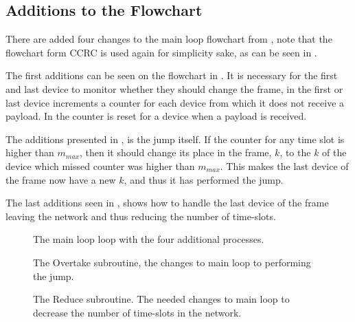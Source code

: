 \subsection{Additions to the Flowchart}
There are added four changes to the main loop flowchart from , note that the flowchart form CCRC is used again for simplicity sake, as can be seen in .

The first additions can be seen on the flowchart in .
It is necessary for the first and last device to monitor whether they should change the frame, in  the first or last device increments a counter for each device from which it does not receive a payload.
In  the counter is reset for a device when a payload is received.

The additions presented in , is the jump itself.
If the counter for any time slot is higher than $m_{max}$, then it should change its place in the frame, $k$, to the $k$ of the device which missed counter was higher than $m_{max}$.
This makes the last device of the frame now have a new $k$, and thus it has performed the jump.	

The last additions seen in , shows how to handle the last device of the frame leaving the network and thus reducing the number of time-slots.
                                                                         
\begin{figure}[!p] 
\vspace{-15pt} 
\centering
\footnotesize

\caption{The main loop loop with the four additional processes.}
\label{fig:mainFrameDefrag}   
\end{figure}  

  

\begin{figure}[!p]
\centering
\footnotesize

\caption{The Overtake subroutine, the changes to main loop to performing the jump.}
\label{fig:jd2}    
\end{figure}

\begin{figure}[!p]
\centering
\footnotesize

\caption{The Reduce subroutine. The needed changes to main loop to decrease the number of time-slots in the network.}
\label{fig:jd3}    
\end{figure}   
